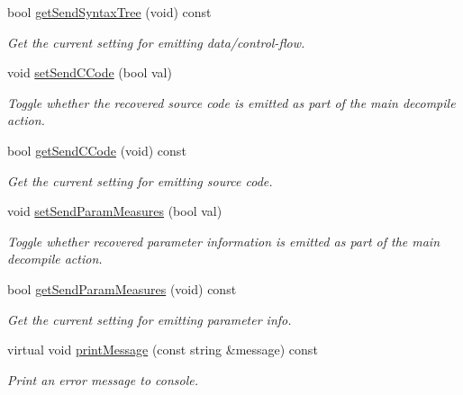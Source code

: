 \begin{DoxyCompactItemize}
bool \mbox{\hyperlink{class_architecture_ghidra_ab8f4f7bfabe1dc8f0ead49700c27a06d}{get\+Send\+Syntax\+Tree}} (void) const
\begin{DoxyCompactList}\small\item\em Get the current setting for emitting data/control-\/flow. \end{DoxyCompactList}\item 
void \mbox{\hyperlink{class_architecture_ghidra_a9c5dc81edf25bc5754821f69a83cd091}{set\+Send\+C\+Code}} (bool val)
\begin{DoxyCompactList}\small\item\em Toggle whether the recovered source code is emitted as part of the main decompile action. \end{DoxyCompactList}\item 
bool \mbox{\hyperlink{class_architecture_ghidra_af958cd760e93ccb0cbf61e650f684a95}{get\+Send\+C\+Code}} (void) const
\begin{DoxyCompactList}\small\item\em Get the current setting for emitting source code. \end{DoxyCompactList}\item 
void \mbox{\hyperlink{class_architecture_ghidra_a1a81c2e3fb902ec976afd5e639a1ba90}{set\+Send\+Param\+Measures}} (bool val)
\begin{DoxyCompactList}\small\item\em Toggle whether recovered parameter information is emitted as part of the main decompile action. \end{DoxyCompactList}\item 
bool \mbox{\hyperlink{class_architecture_ghidra_aba0f384bc9a5aa9155cb61c900e80d04}{get\+Send\+Param\+Measures}} (void) const
\begin{DoxyCompactList}\small\item\em Get the current setting for emitting parameter info. \end{DoxyCompactList}\item 
virtual void \mbox{\hyperlink{class_architecture_ghidra_ae7cdac6309428d288bc2317f9997aa4e}{print\+Message}} (const string \&message) const
\begin{DoxyCompactList}\small\item\em Print an error message to console. \end{DoxyCompactList}\end{DoxyCompactItemize}
